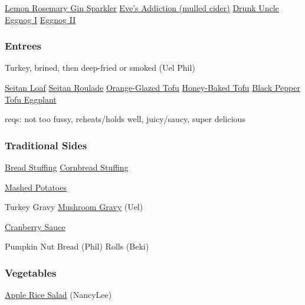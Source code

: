 \begin{centering}
 \href{https://www.seriouseats.com/recipes/2014/11/gin-cocktail-for-crowds-charred-lemon-rosemary-drink-recipe.html}{Lemon Rosemary Gin Sparkler} \blt
 \href{https://www.seriouseats.com/recipes/2013/11/eves-addiction-hot-mulled-cider-recipe.html}{Eve's Addiction (mulled cider)} \blt
 \href{https://www.seriouseats.com/recipes/2016/10/drunk-uncle-scotch-cynar-negroni-cocktail-recipe.html}{Drunk Uncle} \blt
 \hyperref[Eggnog I]{Eggnog I} \blt
 \hyperref[Eggnog II]{Eggnog II}

 \subsubsection*{Entrees}

 Turkey, brined, then deep-fried or smoked (Uel \And Phil)

 \href{http://www.theppk.com/2011/11/seitan-roast-stuffed-with-shiitakes-and-leeks/}{Seitan Loaf} \blt
 \href{https://olivesfordinner.com/2011/11/seitan-roulade-with-sage-and-swee.html}{Seitan Roulade} \blt
 \hyperref[Orange-Glazed Tofu]{Orange-Glazed Tofu} \blt
 \href{https://www.theppk.com/2016/12/sweet-smoky-glazed-tofu-ham/}{Honey-Baked Tofu} \blt
 \href{https://smittenkitchen.com/2019/08/black-pepper-tofu-and-eggplant/}{Black Pepper Tofu \And Eggplant}

 reqs: not too fussy, reheats/holds well, juicy/saucy, super delicious

 \subsubsection*{Traditional Sides}

\hyperref[Bread Stuffing]{Bread Stuffing} \blt \hyperref[Cornbread Stuffing]{Cornbread Stuffing}

 \href{https://www.foodnetwork.com/recipes/alton-brown/creamy-mashed-potatoes-recipe-1956220}{Mashed Potatoes}

Turkey Gravy \blt \href{https://www.kitchentreaty.com/vegetarian-onion-gravy/}{Mushroom Gravy} (Uel)

 \hyperref[Cranberry Sauce]{Cranberry Sauce}

 Pumpkin Nut Bread (Phil) \blt Rolls (Beki)

 \subsubsection*{Vegetables}

 \hyperref[Apple Rice Salad]{Apple Rice Salad} (NancyLee)


\end{centering}
